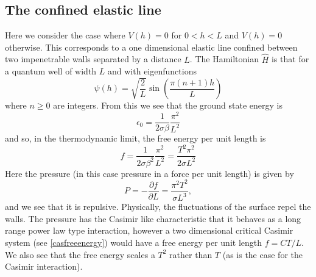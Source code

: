     \subsection{The confined elastic line}
Here we consider the case where $V(h)= 0$ for $0 \less h \less L$ and $V(h)=0$ otherwise. This corresponds to a one dimensional elastic line confined between two impenetrable walls separated by a distance $L$. The Hamiltonian $\hat H$ is that for a quantum well of width $L$ and with eigenfunctions \cite{claude_cohen-tannoudji_mecanique_2018} 
\begin{equation}
\psi(h) = \sqrt{\frac{2}{L}}\sin(\frac{\pi(n+1)h}{L})
\end{equation}
where $n\geq 0$ are integers. From this we see that the ground state energy is 
\begin{equation}
\epsilon_0 = \frac{1}{2\sigma\beta}\frac{\pi^2}{L^2}
\end{equation}
and so, in the thermodynamic limit, the free energy per unit length is
\begin{equation}
f = \frac{1}{2\sigma\beta^2}\frac{\pi^2}{L^2}= \frac{T^2\pi^2}{2\sigma L^2}
\end{equation}
Here the pressure (in this case pressure in a force per unit length) is given by
\begin{equation}
P = -\frac{\partial f}{\partial L} = \frac{\pi^2 T^2}{\sigma L^3},\label{pfree}
\end{equation}
and we see that it is repulsive. Physically, the fluctuations of the surface repel the walls. 
The pressure has the Casimir like characteristic that it behaves as a long range power law type interaction, however a two dimensional critical Casimir system (see \eqref{casfreeenergy}) would have a free energy per unit length $f=CT/L$. We also see that the free energy scales  a $T^2$ rather than $T$ (as is the case for the Casimir interaction).

